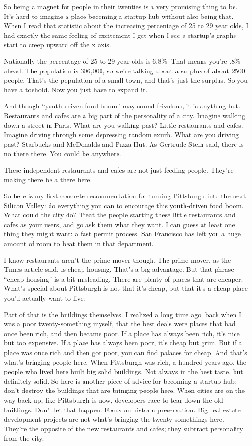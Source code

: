 So being a magnet for people in their twenties is a very promising thing
to be. It's hard to imagine a place becoming a startup hub without also
being that. When I read that statistic about the increasing percentage
of 25 to 29 year olds, I had exactly the same feeling of excitement I
get when I see a startup's graphs start to creep upward off the x axis.

Nationally the percentage of 25 to 29 year olds is 6.8\%. That means
you're .8\% ahead. The population is 306,000, so we're talking about a
surplus of about 2500 people. That's the population of a small town, and
that's just the surplus. So you have a toehold. Now you just have to
expand it.

And though ``youth-driven food boom'' may sound frivolous, it is
anything but. Restaurants and cafes are a big part of the personality of
a city. Imagine walking down a street in Paris. What are you walking
past? Little restaurants and cafes. Imagine driving through some
depressing random exurb. What are you driving past? Starbucks and
McDonalds and Pizza Hut. As Gertrude Stein said, there is no there
there. You could be anywhere.

These independent restaurants and cafes are not just feeding people.
They're making there be a there here.

So here is my first concrete recommendation for turning Pittsburgh into
the next Silicon Valley: do everything you can to encourage this
youth-driven food boom. What could the city do? Treat the people
starting these little restaurants and cafes as your users, and go ask
them what they want. I can guess at least one thing they might want: a
fast permit process. San Francisco has left you a huge amount of room to
beat them in that department.

I know restaurants aren't the prime mover though. The prime mover, as
the Times article said, is cheap housing. That's a big advantage. But
that phrase ``cheap housing'' is a bit misleading. There are plenty of
places that are cheaper. What's special about Pittsburgh is not that
it's cheap, but that it's a cheap place you'd actually want to live.

Part of that is the buildings themselves. I realized a long time ago,
back when I was a poor twenty-something myself, that the best deals were
places that had once been rich, and then became poor. If a place has
always been rich, it's nice but too expensive. If a place has always
been poor, it's cheap but grim. But if a place was once rich and then
got poor, you can find palaces for cheap. And that's what's bringing
people here. When Pittsburgh was rich, a hundred years ago, the people
who lived here built big solid buildings. Not always in the best taste,
but definitely solid. So here is another piece of advice for becoming a
startup hub: don't destroy the buildings that are bringing people here.
When cities are on the way back up, like Pittsburgh is now, developers
race to tear down the old buildings. Don't let that happen. Focus on
historic preservation. Big real estate development projects are not
what's bringing the twenty-somethings here. They're the opposite of the
new restaurants and cafes; they subtract personality from the city.

